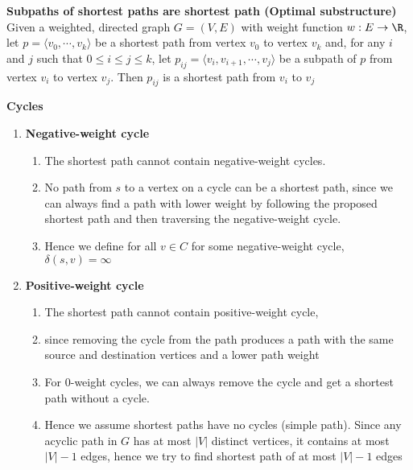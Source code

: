 \documentclass[11pt]{article}
\begin{document}
\begin{proposition*}
    \textbf{Subpaths of shortest paths are shortest path (Optimal substructure)} Given a weighted, directed graph $G = (V,E)$ with weight function $w: E\to \R$, let $p = \langle v_0,\cdots, v_k \rangle$ be a shortest path from vertex $v_0$ to vertex $v_k$ and, for any $i$ and $j$ such that $0 \leq i \leq j \leq k$, let $p_{ij} = \langle v_i, v_{i+1}, \cdots, v_j \rangle$ be a subpath of $p$ from vertex $v_i$ to vertex $v_j$. Then $p_{ij}$ is a shortest path from $v_i$ to $v_j$
\end{proposition*}


\begin{proposition*}
    \textbf{Cycles} 
    \begin{enumerate}
        \item \textbf{Negative-weight cycle} 
        \begin{enumerate}
            \item The shortest path cannot contain negative-weight cycles.
            \item No path from $s$ to a vertex on a cycle can be a shortest path, since we can always find a path with lower weight by following the proposed shortest path and then traversing the negative-weight cycle. 
            \item Hence we define for all $v \in C$ for some negative-weight cycle, $\delta(s,v) = \infty$
        \end{enumerate}
        \item \textbf{Positive-weight cycle} 
        \begin{enumerate}
            \item The shortest path cannot contain positive-weight cycle, 
            \item since removing the cycle from the path produces a path with the same source and destination vertices and a lower path weight
            \item For 0-weight cycles, we can always remove the cycle and get a shortest path without a cycle. 
            \item Hence we assume shortest paths have no cycles (simple path). Since any acyclic path in $G$ has at most $|V|$ distinct vertices, it contains at most $|V| - 1$ edges, hence we try to find shortest path of at most $|V| - 1$ edges
        \end{enumerate}
    \end{enumerate}
\end{proposition*}
\end{document}
